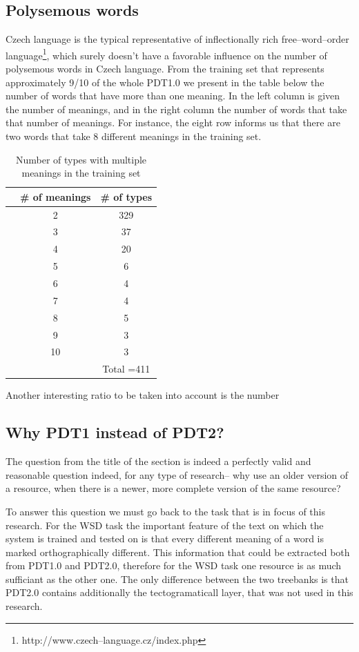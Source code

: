 \subsection{Polysemous words}\label{pdt}
Czech language is the typical representative of inflectionally rich free--word--order language\footnote{http://www.czech--language.cz/index.php}, which surely doesn't have a favorable influence on the number of polysemous words in Czech language. From the training set that represents approximately 9/10 of the whole PDT1.0 we present in the table below the number of words that have more than one meaning. In the left column is given the number of meanings, and in the right column the number of words that take that number of meanings. For instance, the eight row informs us that there are two words that take 8 different meanings in the training set.
\begin{table}[h!]
\begin{center}
	\begin{tabular}{ c  c |  c }
   	&   \# of meanings & \# of types \\
\hline  
 & 2 & 329  \\
 & 3 & 37  \\
 & 4 & 20  \\
 & 5 & 6  \\
 & 6 & 4  \\
 & 7 & 4  \\
 & 8 & 5  \\
 & 9 & 3  \\
 & 10 & 3  \\
\hline  
& &Total =411\\  
 	\end{tabular}
\end{center}
\caption{Number of types with multiple meanings in the training set}
\end{table}
Another interesting ratio to be taken into account is the number 



\subsection{Why PDT1 instead of PDT2?}
The question from the title of the section is indeed a perfectly valid and reasonable question indeed, for 
any type of research-- why use an older version of a resource, when there is a newer, more complete 
version of the same resource?  

To answer this question we must go back to the task that is in focus of this research. For the WSD task the 
important feature of the text on which the system is trained and tested on is that every different meaning of a 
word is marked orthographically different. This information that could be extracted both from PDT1.0 and 
PDT2.0, therefore for the WSD task one resource is as much sufficiant as the other one. The only 
difference between the two treebanks is that PDT2.0 contains additionally the tectogramaticall layer, that 
was not used in this research.  

